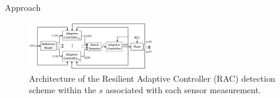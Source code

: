 \begin{section}{Approach}

\begin{figure}[h!]
\vspace{-3pt}
\centering
\includegraphics[width=0.48\textwidth]{Figures/con_and_det.png}
\caption{Architecture of the Resilient Adaptive Controller (RAC) detection scheme within the $s$ associated with each sensor measurement. }
\label{fig:det_arch}
\end{figure}


\end{section}
